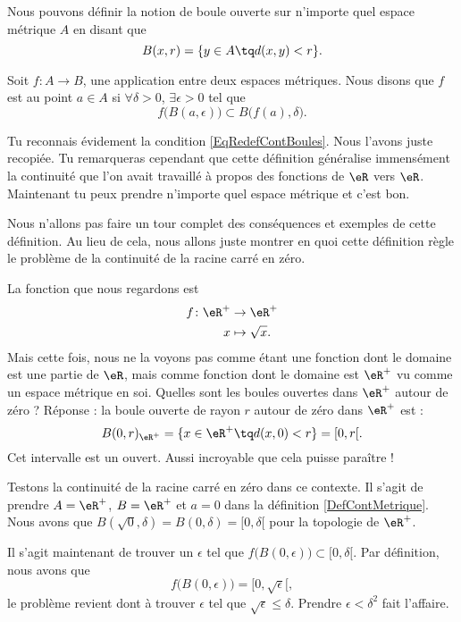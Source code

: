 \documentclass{article}
\begin{document}
Nous pouvons définir la notion de boule ouverte sur n'importe quel espace métrique $A$ en disant que
\[ 
  B(x,r)=\{ y\in A\tq d(x,y)<r \}.
\]
\begin{definition}		\label{DefContMetrique}
Soit $f\colon A\to B$, une application entre deux espaces métriques. Nous disons que $f$ est  au point $a\in A$ si $\forall \delta>0$, $\exists\epsilon>0$ tel que 
\begin{equation}
  f\big( B(a,\epsilon) \big)\subset B\big( f(a),\delta \big).
\end{equation}
\end{definition}
Tu reconnais évidement la condition \eqref{EqRedefContBoules}. Nous l'avons juste recopiée. Tu remarqueras cependant que cette définition généralise immensément la continuité que l'on avait travaillé à propos des fonctions de $\eR$ vers $\eR$. Maintenant tu peux prendre n'importe quel espace métrique et c'est bon.

Nous n'allons pas faire un tour complet des conséquences et exemples de cette définition. Au lieu de cela, nous allons juste montrer en quoi cette définition règle le problème de la continuité de la racine carré en zéro.

La fonction que nous regardons est 
\begin{equation}
\begin{aligned}
f \colon \eR^+&\to \eR^+ \\ 
   x&\mapsto \sqrt{x}.
\end{aligned}
\end{equation}
Mais cette fois, nous ne la voyons pas comme étant une fonction dont le domaine est une partie de $\eR$, mais comme fonction dont le domaine est $\eR^+$ vu comme un espace métrique en soi. Quelles sont les boules ouvertes dans $\eR^+$ autour de zéro ? Réponse : la boule ouverte de rayon $r$ autour de zéro dans $\eR^+$ est :
\[ 
  B(0,r)_{\eR^+}=\{ x\in\eR^+\tq d(x,0)<r \}=[0,r[.  
\]
Cet intervalle est un ouvert. Aussi incroyable que cela puisse paraître !

Testons la continuité de la racine carré en zéro dans ce contexte. Il s'agit de prendre $A=\eR^+$, $B=\eR^+$ et $a=0$ dans la définition \ref{DefContMetrique}. Nous avons que $B(\sqrt{0},\delta)=B(0,\delta)=[0,\delta[$ pour la topologie de $\eR^+$.

Il s'agit maintenant de trouver un $\epsilon$ tel que $f\big( B(0,\epsilon) \big)\subset [0,\delta[$. Par définition, nous avons que
\[ 
  f\big( B(0,\epsilon) \big)=[0,\sqrt{\epsilon}[,
\]
le problème revient dont à trouver $\epsilon$ tel que $\sqrt{\epsilon}\leq\delta$. Prendre $\epsilon<\delta^2$ fait l'affaire.
\end{document}
